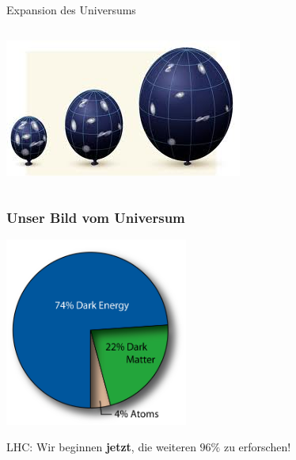 \documentclass{beamer}
\begin{document}
{\begin{frame}
\begin{center}
{\begin{block}{Expansion des Universums}
\begin{columns}
             \begin{column}{0.65\textwidth}
               \centering
               \vskip-0.5cm
               \includegraphics[height=0.35\textheight]{cosmology/UniverseExpansion.jpg}
             \end{column}
           \end{columns}
         \end{block}
       }
     \end{center}
   \end{frame}

   \begin{frame}
     \frametitle{Unser Bild vom Universum}
     \begin{center}
       \includegraphics[width=0.45\textwidth]{cosmology/MatterContentOfTheUniverse.jpg}
     \end{center}
     \pause
     \begin{center}
       \begin{block}{}
         \centering
         {\large LHC: \alert{Wir beginnen \textbf{jetzt}, die weiteren $96\%$ zu erforschen!}}
       \end{block}
     \end{center}
   \end{frame}
}
\end{document}

